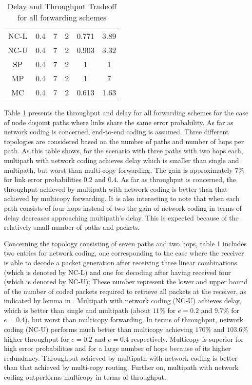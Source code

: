\documentclass[journal, onecolumn, 12pt]{IEEEtran}
\begin{document}
\begin{table}[ht]
\begin{tabular}{c c c c c c}
NC-L & 0.4 & 7 & 2 & 0.771 & 3.89  \\
NC-U & 0.4 & 7 & 2 & 0.903 & 3.32  \\
SP & 0.4 & 7 & 2 & 1 &  1  \\
MP & 0.4 & 7 & 2 & 1 & 7 \\
MC & 0.4 & 7 & 2 & 0.613 & 1.63 \\ [1ex]
\hline
\end{tabular}
\caption{Delay and Throughput Tradeoff for all forwarding schemes}
\label{table:trnodedisjoint}
\end{table}

Table \ref{table:trnodedisjoint} presents the throughput and delay for all forwarding schemes for the case of node disjoint paths where links share the same error probability.
As far as network coding is concerned, end-to-end  coding is assumed.
Three different topologies are considered based on the number of paths and number of hops per path.
As this table shows, for the scenario with three paths with two hops each, multipath with network coding achieves delay which is smaller than single and multipath, but worst than multi-copy forwarding.
The gain is approximately $7\%$ for link error probabilities $0.2$ and $0.4$.
As far as throughput is concerned, the throughput achieved by multipath with network coding is better than that achieved by multicopy forwarding.
It is also interesting to note that when each path consists of four hops instead of two the gain of network coding in terms of delay decreases approaching multipath's delay.
This is expected because of the relatively small number of paths and packets.

Concerning the topology consisting of seven paths and two hops, table \ref{table:trnodedisjoint} includes two entries for network coding, one corresponding to the
case where the receiver is able to decode a packet generation after receiving three linear combinations (which is denoted by NC-L) and one for decoding after having received four (which is denoted by NC-U);
These number represent the lower and upper bound of the number of coded packets required to retrieve all packets at the receiver, as indicated by lemma in \cite{b:pathdivgain1}.
Multipath with network coding (NC-U) achieves delay, which is better than single and multipath (about $11\%$ for $e=0.2$ and $9.7\%$ for $e=0.4$), but worst than multicopy forwarding.
In terms of throughput, network coding (NC-U) performs much better than multicopy achieving $170\%$ and $103.6\%$ higher throughput for $e=0.2$ and $e=0.4$ respectively.
Multicopy is superior for high error probabilities and for a large number of hops because of its higher redundancy.
Throughput achieved by multipath with network coding is better than that achieved by multi-copy routing.
Further on, multipath with network coding outperforms multicopy in terms of throughput.
\end{document}
